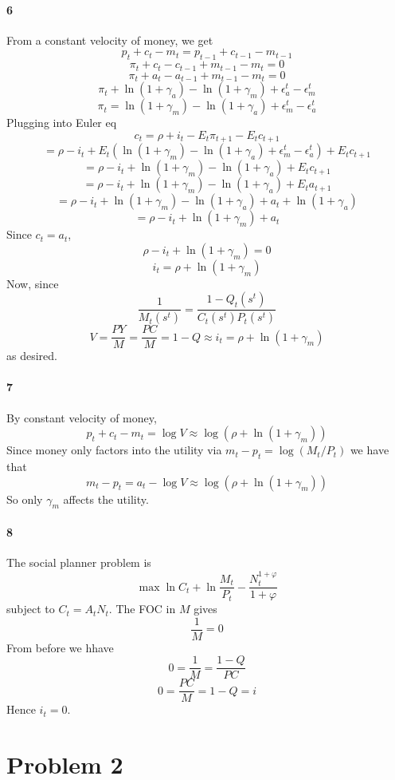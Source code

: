\documentclass[10pt,letter]{article}
\newcommand{\problem}[1]{\section*{Problem #1}}
\newcommand{\problempart}[1]{\paragraph{#1}}
\begin{document}
\problempart{6}
From a constant velocity of money, we get
\[ p_t + c_t - m_t = p_{t-1} + c_{t-1} - m_{t-1} \]
\[ \pi_t + c_t - c_{t-1} + m_{t-1} - m_t = 0 \]
\[ \pi_t + a_t - a_{t-1} + m_{t-1} - m_t = 0 \]
\[ \pi_t + \ln(1 + \gamma_a) - \ln(1 + \gamma_m) + \epsilon_a^t - \epsilon_m^t \]
\[ \pi_t = \ln(1 + \gamma_m) - \ln(1 + \gamma_a) + \epsilon_m^t - \epsilon_a^t \]
Plugging into Euler eq
\[ c_t = \rho + i_t - E_t\pi_{t+1} - E_t c_{t+1} \]
\[ = \rho - i_t + E_t\left(\ln(1 + \gamma_m) - \ln(1 + \gamma_a) + \epsilon_m^t - \epsilon_a^t \right) + E_t c_{t+1} \]
\[ = \rho - i_t + \ln(1 + \gamma_m) - \ln(1 + \gamma_a) + E_t c_{t+1} \]
\[ = \rho - i_t + \ln(1 + \gamma_m) - \ln(1 + \gamma_a) + E_t a_{t+1} \]
\[ = \rho - i_t + \ln(1 + \gamma_m) - \ln(1 + \gamma_a) + a_t + \ln(1 + \gamma_a) \]
\[ = \rho - i_t + \ln(1 + \gamma_m) + a_t  \]
Since $c_t = a_t$,
\[ \rho - i_t + \ln(1 + \gamma_m)  = 0 \]
\[ i_t = \rho + \ln(1 + \gamma_m) \]
Now, since
\[ \frac{1}{M_t(s^t)} = \frac{1- Q_t(s^t)}{C_t(s^t)P_t(s^t)}   \]
\[ V  = \frac{PY}{M} = \frac{PC}{M} = 1 - Q \approx i_t = \rho + \ln(1+ \gamma_m) \]
as desired.
\problempart{7}
By constant velocity of money,
\[ p_t + c_t - m_t = \log V \approx \log (\rho + \ln(1+ \gamma_m)) \]
Since money only factors into the utility via $m_t - p_t = \log (M_t/P_t)$ we have that
\[  m_t - p_t = a_t - \log V \approx \log (\rho + \ln(1+ \gamma_m)) \]
So only $\gamma_m$ affects the utility.

\problempart{8}
The social planner problem is
\[ \max \ln C_t + \ln \frac{M_t}{P_t} - \frac{N_t^{1+\varphi}}{1+ \varphi} \]
subject to $C_t = A_tN_t$. The FOC in $M$ gives
\[ \frac{1}{M} = 0 \]
From before we hhave
\[ 0 = \frac{1}{M} = \frac{1-Q}{PC} \]
\[ 0 = \frac{PC}{M} = 1-Q = i \]
Hence $i_t = 0$.


\problem{2}
\end{document}

